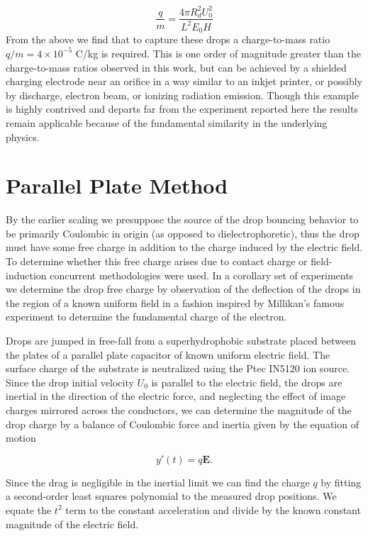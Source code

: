 \documentclass[12pt,a4paper,oneside]{book}
\begin{document}
\[
\frac{q}{m} = \frac{4 \pi R_d^2 U_0^2}{L^2 E_0 H}
\]
From the above we find that to capture these drops a charge-to-mass ratio $q/m=4 \times 10^{-5}$ C/kg is required. This is one order of magnitude greater than the charge-to-mass ratios observed in this work, but can be achieved by a shielded charging electrode near an orifice in a way similar to an inkjet printer, or possibly by discharge, electron beam, or ionizing radiation emission. Though this example is highly contrived and departs far from the experiment reported here the results remain applicable because of the fundamental similarity in the underlying physics.

\appendix
\appendixpage
\noappendicestocpagenum
\addappheadtotoc

\chapter{Parallel Plate Method}
\label{sec.drop_charge}
By the earlier scaling we presuppose the source of the drop bouncing behavior to be primarily Coulombic in origin (as opposed to dielectrophoretic), thus the drop must have some free charge in addition to the charge induced by the electric field. To determine whether this free charge arises due to contact charge or field-induction concurrent methodologies were used. In a corollary set of experiments we determine the drop free charge by observation of the deflection of the drops in the region of a known uniform field in a fashion inspired by Millikan's famous experiment to determine the fundamental charge of the electron.

Drops are jumped in free-fall from a superhydrophobic substrate placed between the plates of a parallel plate capacitor of known uniform electric field. The surface charge of the substrate is neutralized using the Ptec IN5120 ion source. Since the drop initial velocity $U_0$ is parallel to the electric field, the drops are inertial in the direction of the electric force, and neglecting the effect of image charges mirrored across the conductors, we can determine the magnitude of the drop charge by a balance of Coulombic force and inertia given by the equation of motion

\[ y'(t) = q\mathbf{E}. \]

Since the drag is negligible in the inertial limit we can find the charge $q$ by fitting a second-order least squares polynomial to the measured drop positions. We equate the $t^2$ term to the constant acceleration and divide by the known constant magnitude of the electric field.  
\end{document}
